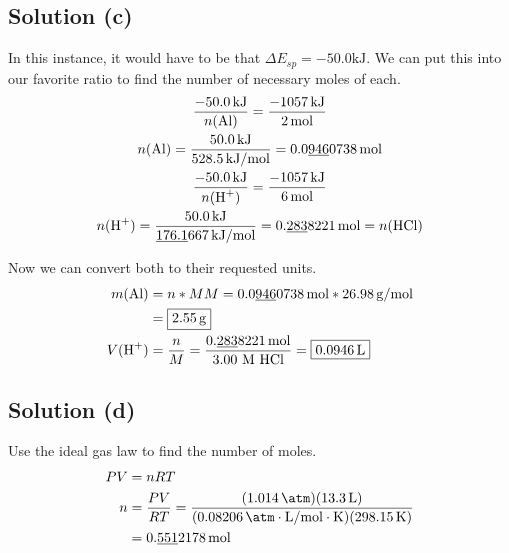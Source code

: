 \documentclass[10pt]{article}
\newcommand{\U}[1]{\underline{#1}}
\begin{document}
        \subsection{Solution (c)}
            In this instance, it would have to be that $\Delta E_{sp} = -50.0\unit{\kilo\joule}$. 
            We can put this into our favorite ratio to find the number of necessary moles of each. 
            \begin{gather}
                \frac{-50.0\,\unit{\kilo\joule}}{n(\ce{Al})}    =   \frac{-1057\,\unit{\kilo\joule}}{2\,\unit{\mole}}\\
                n(\ce{Al})  =   \frac{50.0\,\unit{\kilo\joule}}{528.5\,\unit{\kilo\joule/\mole}}
                    =   0.0\U{946}0738\,\unit{\mole}\\
                \frac{-50.0\,\unit{\kilo\joule}}{n(\ce{H+})}    =   \frac{-1057\,\unit{\kilo\joule}}{6\,\unit{\mole}}\\
                n(\ce{H+})  =   \frac{50.0\,\unit{\kilo\joule}}{\U{176.1}667\,\unit{\kilo\joule/\mole}}
                    =   0.\U{283}8221\,\unit{\mole}
                    =   n(\ce{HCl})
            \end{gather}

            Now we can convert both to their requested units.
            \begin{align}
                m(\ce{Al})  &=  n * MM
                    =   0.0\U{946}0738\,\unit{\mole} * 26.98\,\unit{\gram/\mole}\\
                    &=  \boxed{2.55\,\unit{\gram}}\\
                V(\ce{H+})  &=  \frac{n}{M}
                    =   \frac{0.\U{283}8221\,\unit{\mole}}{3.00 \text{ M HCl}}
                    =   \boxed{0.0946\,\unit{\liter}}
            \end{align}

        \subsection{Solution (d)}
            Use the ideal gas law to find the number of moles.
            \begin{align}
                PV  &=  nRT\\
                n   &=  \frac{PV}{RT}
                    =   \frac{(1.014\,\unit{\atm})(13.3\,\unit{\liter})}{(0.08206\,\unit{\atm\cdot\liter/\mole\cdot\kelvin})(298.15\,\unit{\kelvin})}\\
                    &=  0.\U{551}2178\,\unit{\mole}
            \end{align}
\end{document}
